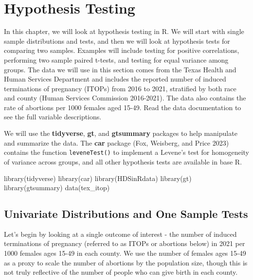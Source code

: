 \documentclass[
  letterpaper,
]{krantz}
\makeatletter
\newenvironment{Shaded}{\begin{snugshade}}{\end{snugshade}}
\newcommand{\FunctionTok}[1]{\textcolor[rgb]{0.28,0.35,0.67}{#1}}
\newcommand{\NormalTok}[1]{\textcolor[rgb]{0.00,0.23,0.31}{#1}}
\newenvironment{kframe}{%
\medskip{}
\setlength{\fboxsep}{.8em}
 \def\at@end@of@kframe{}%
 \ifinner\ifhmode%
  \def\at@end@of@kframe{\end{minipage}}%
  \begin{minipage}{\columnwidth}%
 \fi\fi%
 \def\FrameCommand##1{\hskip\@totalleftmargin \hskip-\fboxsep
 \colorbox{shadecolor}{##1}\hskip-\fboxsep
     \hskip-\linewidth \hskip-\@totalleftmargin \hskip\columnwidth}%
 \MakeFramed {\advance\hsize-\width
   \@totalleftmargin\z@ \linewidth\hsize
   \@setminipage}}%
 {\par\unskip\endMakeFramed%
 \at@end@of@kframe}
\renewenvironment{Shaded}{\begin{kframe}}{\end{kframe}}
\makeatother
\begin{document}
\chapter{Hypothesis Testing}\label{sec-hypothesis-testing}

In this chapter, we will look at hypothesis testing in R. We will start
with single sample distributions and tests, and then we will look at
hypothesis tests for comparing two samples. Examples will include
testing for positive correlations, performing two sample paired t-tests,
and testing for equal variance among groups. The data we will use in
this section comes from the Texas Health and Human Services Department
and includes the reported number of induced terminations of pregnancy
(ITOPs) from 2016 to 2021, stratified by both race and county (Human
Services Commission 2016-2021). The data also contains the rate of
abortions per 1000 females aged 15-49. Read the data documentation to
see the full variable descriptions.

We will use the \textbf{tidyverse}, \textbf{gt}, and \textbf{gtsummary}
packages to help manipulate and summarize the data. The \textbf{car}
package (Fox, Weisberg, and Price 2023) contains the function
\texttt{leveneTest()} to implement a Levene's test for homogeneity of
variance across groups, and all other hypothesis tests are available in
base R.

\begin{Shaded}
\begin{Highlighting}[]
\FunctionTok{library}\NormalTok{(tidyverse)}
\FunctionTok{library}\NormalTok{(car)}
\FunctionTok{library}\NormalTok{(HDSinRdata)}
\FunctionTok{library}\NormalTok{(gt)}
\FunctionTok{library}\NormalTok{(gtsummary)}
\FunctionTok{data}\NormalTok{(tex\_itop)}
\end{Highlighting}
\end{Shaded}

\section{Univariate Distributions and One Sample
Tests}\label{univariate-distributions-and-one-sample-tests}

Let's begin by looking at a single outcome of interest - the number of
induced terminations of pregnancy (referred to as ITOPs or abortions
below) in 2021 per 1000 females ages 15-49 in each county. We use the
number of females ages 15-49 as a proxy to scale the number of abortions
by the population size, though this is not truly reflective of the
number of people who can give birth in each county.
\end{document}
